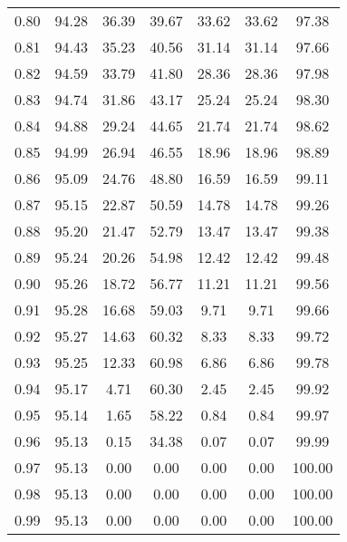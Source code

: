 \begin{tabular}{|c|c|c|c|c|c|c|}
      0.80 &     94.28 &     36.39 &      39.67 &   33.62 &      33.62 &         97.38 \\
      0.81 &     94.43 &     35.23 &      40.56 &   31.14 &      31.14 &         97.66 \\
      0.82 &     94.59 &     33.79 &      41.80 &   28.36 &      28.36 &         97.98 \\
      0.83 &     94.74 &     31.86 &      43.17 &   25.24 &      25.24 &         98.30 \\
      0.84 &     94.88 &     29.24 &      44.65 &   21.74 &      21.74 &         98.62 \\
      0.85 &     94.99 &     26.94 &      46.55 &   18.96 &      18.96 &         98.89 \\
      0.86 &     95.09 &     24.76 &      48.80 &   16.59 &      16.59 &         99.11 \\
      0.87 &     95.15 &     22.87 &      50.59 &   14.78 &      14.78 &         99.26 \\
      0.88 &     95.20 &     21.47 &      52.79 &   13.47 &      13.47 &         99.38 \\
      0.89 &     95.24 &     20.26 &      54.98 &   12.42 &      12.42 &         99.48 \\
      0.90 &     95.26 &     18.72 &      56.77 &   11.21 &      11.21 &         99.56 \\
      0.91 &     95.28 &     16.68 &      59.03 &    9.71 &       9.71 &         99.66 \\
      0.92 &     95.27 &     14.63 &      60.32 &    8.33 &       8.33 &         99.72 \\
      0.93 &     95.25 &     12.33 &      60.98 &    6.86 &       6.86 &         99.78 \\
      0.94 &     95.17 &      4.71 &      60.30 &    2.45 &       2.45 &         99.92 \\
      0.95 &     95.14 &      1.65 &      58.22 &    0.84 &       0.84 &         99.97 \\
      0.96 &     95.13 &      0.15 &      34.38 &    0.07 &       0.07 &         99.99 \\
      0.97 &     95.13 &      0.00 &       0.00 &    0.00 &       0.00 &        100.00 \\
      0.98 &     95.13 &      0.00 &       0.00 &    0.00 &       0.00 &        100.00 \\
      0.99 &     95.13 &      0.00 &       0.00 &    0.00 &       0.00 &        100.00 \\
\bottomrule
\end{tabular}
